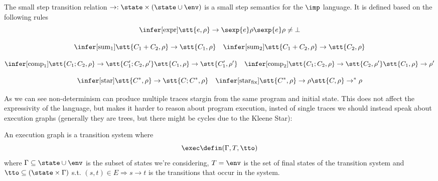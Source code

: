 \begin{definition}\label{def:sosem}
  The small step transition relation \(\to : \state \times (\state
  \cup \env)\) is a small step semantics for the
  \(\imp\) language. It is defined based on the following rules
  \[\infer[\text{expr}]
          {\stt{e, \rho} \to \sexp{e}\rho}
          {\sexp{e}\rho \neq \bot}\]
          
          \[\infer[\text{sum}_1]
                  {\stt{C_1 + C_2, \rho} \to \stt{C_1, \rho}}
                  {} \quad
                  \infer[\text{sum}_2]
                        {\stt{C_1 + C_2, \rho} \to \stt{C_2, \rho}}
                        {}\]
                        
                        \[\infer[\text{comp}_1]
                                {\stt{C_1; C_2, \rho} \to \stt{C_1'; C_2, \rho'}}
                                {\stt{C_1, \rho} \to \stt{C_1', \rho'}} \quad
                                \infer[\text{comp}_2]
                                      {\stt{C_1; C_2, \rho} \to \stt{C_2, \rho'}}
                                      {\stt{C_1, \rho} \to \rho'}\]

                                      \[\infer[\text{star}]
                                              {\stt{C^*, \rho} \to \stt{C;C^*, \rho}}
                                              {} \quad
                                              \infer[\text{star}_{\text{fix}}]
                                                    {\stt{C^*, \rho} \to \rho}
                                                    {\stt{C, \rho} \to^* \rho}\]
\end{definition}

As we can see non-determinism can produce multiple traces stargin from
the same program and initial state. This does not affect the
expressivity of the language, but makes it harder to reason about
program execution, insted of single traces we should instead speak
about execution graphs (generally they are trees, but there might be
cycles due to the Kleene Star):

\begin{definition}
  An execution graph is a transition system where \[\exec \defin
  (\Gamma, T, \tto)\] where \(\Gamma \subseteq \state \cup \env\) is
  the subset of states we're considering, \(T = \env\) is the set of
  final states of the transition system and \(\tto \subseteq (\state
  \times \Gamma)\) s.t. \((s,t) \in E \Rightarrow s \to t\) is the
  transitions that occur in the system.
\end{definition}

